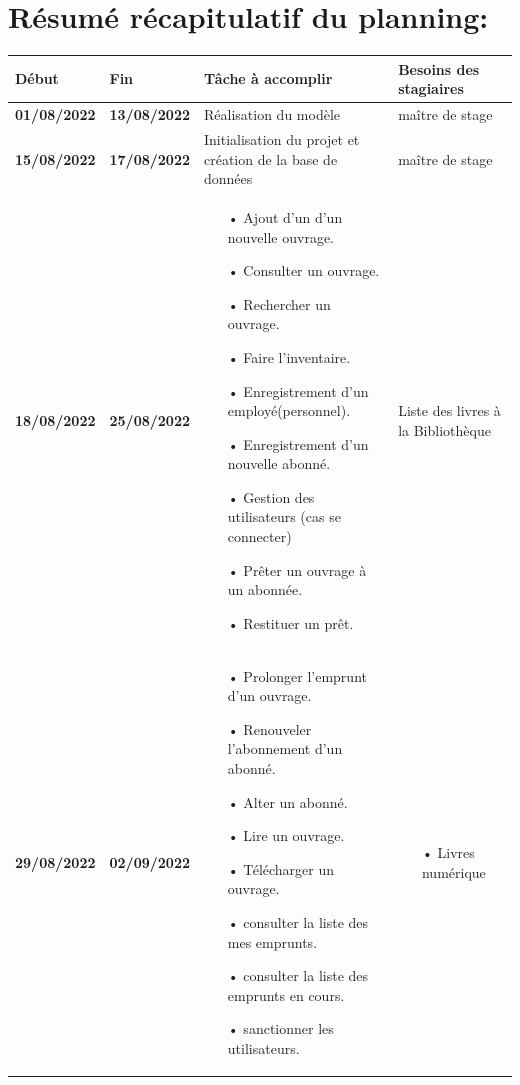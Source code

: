 \documentclass[12pt,a4paper]{article}
\begin{document}
\section{Résumé récapitulatif du planning:}
\begin{center}
\begin{tabular}{|p{2.2cm}|p{2.2cm}|p{6.5cm}|p{6.5cm}|}
\hline 
Début & Fin & Tâche à accomplir & Besoins des stagiaires \\ 
\hline 
\textbf{01/08/2022} & \textbf{13/08/2022} & Réalisation du modèle & maître de stage\\ 
\hline 
\textbf{15/08/2022} & \textbf{17/08/2022} & Initialisation du projet et création de la base de données & maître de stage \\ 
\hline
\textbf{18/08/2022} & \textbf{25/08/2022} & \begin{itemize}
\item[•] Ajout d'un d'un nouvelle ouvrage.
\item[•] Consulter un ouvrage.
\item[•] Rechercher un ouvrage.
\item[•] Faire l'inventaire.
\item[•] Enregistrement d'un employé(personnel).
\item[•] Enregistrement d'un nouvelle abonné.
\item[•] Gestion des utilisateurs (cas se connecter)
\item[•] Prêter un ouvrage à un abonnée.
\item[•] Restituer un prêt.
\end{itemize} & Liste des livres à la Bibliothèque \\ 
\hline 
\textbf{29/08/2022} & \textbf{02/09/2022} & \begin{itemize}
\item[•] Prolonger l'emprunt d'un ouvrage.
\item[•] Renouveler l'abonnement d'un abonné.
\item[•] Alter un abonné.
\item[•] Lire un ouvrage.
\item[•] Télécharger un ouvrage.
\item[•] consulter la liste des mes emprunts.
\item[•] consulter la liste des emprunts en cours.
\item[•] sanctionner les utilisateurs.
\end{itemize} & 
\begin{itemize}
\item[•] Livres numérique

\end{itemize}
\end{tabular}
\end{center}
\end{document}
